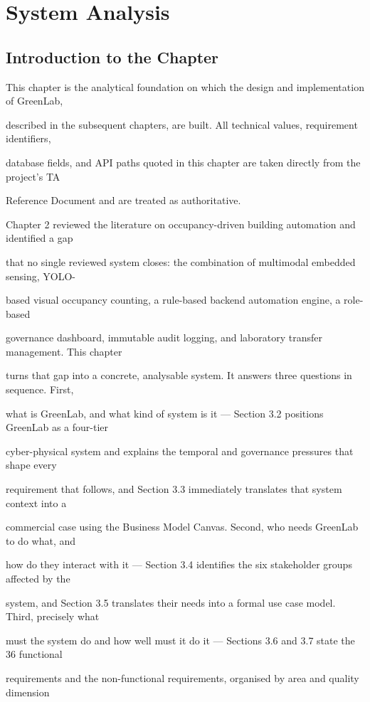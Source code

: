 \chapter{System Analysis}

\section{Introduction to the Chapter}
This chapter is the analytical foundation on which the design and implementation of GreenLab,

described in the subsequent chapters, are built. All technical values, requirement identifiers,

database fields, and API paths quoted in this chapter are taken directly from the project's TA

Reference Document and are treated as authoritative.

Chapter 2 reviewed the literature on occupancy-driven building automation and identified a gap

that no single reviewed system closes: the combination of multimodal embedded sensing, YOLO-

based visual occupancy counting, a rule-based backend automation engine, a role-based

governance dashboard, immutable audit logging, and laboratory transfer management. This chapter

turns that gap into a concrete, analysable system. It answers three questions in sequence. First,

what is GreenLab, and what kind of system is it --- Section 3.2 positions GreenLab as a four-tier

cyber-physical system and explains the temporal and governance pressures that shape every

requirement that follows, and Section 3.3 immediately translates that system context into a

commercial case using the Business Model Canvas. Second, who needs GreenLab to do what, and

how do they interact with it --- Section 3.4 identifies the six stakeholder groups affected by the

system, and Section 3.5 translates their needs into a formal use case model. Third, precisely what

must the system do and how well must it do it --- Sections 3.6 and 3.7 state the 36 functional

requirements and the non-functional requirements, organised by area and quality dimension

